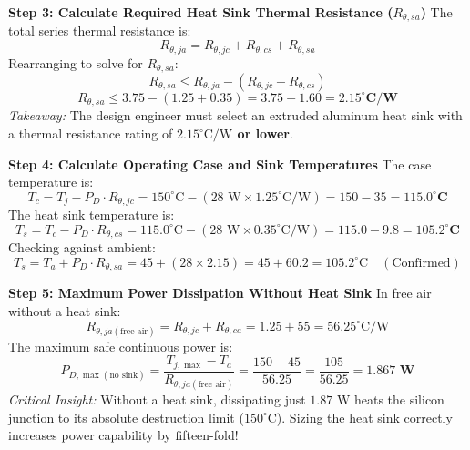 \documentclass[11pt,a4paper]{article}
\begin{document}
\begin{examplebox}
\textbf{Step 3: Calculate Required Heat Sink Thermal Resistance ($R_{\theta,sa}$)}
The total series thermal resistance is:
\begin{equation}
R_{\theta,ja} = R_{\theta,jc} + R_{\theta,cs} + R_{\theta,sa}
\end{equation}
Rearranging to solve for $R_{\theta,sa}$:
\begin{equation}
R_{\theta,sa} \le R_{\theta,ja} - (R_{\theta,jc} + R_{\theta,cs})
\end{equation}
\begin{equation}
R_{\theta,sa} \le 3.75 - (1.25 + 0.35) = 3.75 - 1.60 = \mathbf{2.15^\circ\text{C/W}}
\end{equation}
\textit{Takeaway:} The design engineer must select an extruded aluminum heat sink with a thermal resistance rating of \textbf{$2.15^\circ\text{C/W}$ or lower}.

\textbf{Step 4: Calculate Operating Case and Sink Temperatures}
The case temperature is:
\begin{equation}
T_c = T_j - P_D \cdot R_{\theta,jc} = 150^\circ\text{C} - (28\text{ W} \times 1.25^\circ\text{C/W}) = 150 - 35 = \mathbf{115.0^\circ\text{C}}
\end{equation}
The heat sink temperature is:
\begin{equation}
T_s = T_c - P_D \cdot R_{\theta,cs} = 115.0^\circ\text{C} - (28\text{ W} \times 0.35^\circ\text{C/W}) = 115.0 - 9.8 = \mathbf{105.2^\circ\text{C}}
\end{equation}
Checking against ambient:
\begin{equation}
T_s = T_a + P_D \cdot R_{\theta,sa} = 45 + (28 \times 2.15) = 45 + 60.2 = 105.2^\circ\text{C} \quad (\text{Confirmed})
\end{equation}

\textbf{Step 5: Maximum Power Dissipation Without Heat Sink}
In free air without a heat sink:
\begin{equation}
R_{\theta,ja(\text{free air})} = R_{\theta,jc} + R_{\theta,ca} = 1.25 + 55 = 56.25^\circ\text{C/W}
\end{equation}
The maximum safe continuous power is:
\begin{equation}
P_{D,\max(\text{no sink})} = \frac{T_{j,\max} - T_a}{R_{\theta,ja(\text{free air})}} = \frac{150 - 45}{56.25} = \frac{105}{56.25} = \mathbf{1.867\text{ W}}
\end{equation}
\textit{Critical Insight:} Without a heat sink, dissipating just $1.87\text{ W}$ heats the silicon junction to its absolute destruction limit ($150^\circ\text{C}$). Sizing the heat sink correctly increases power capability by fifteen-fold!
\end{examplebox}
\end{document}
